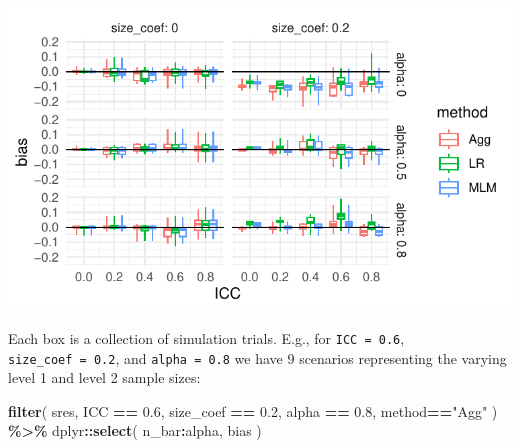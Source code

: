 \documentclass[
]{book}
\newenvironment{Shaded}{\begin{snugshade}}{\end{snugshade}}
\newcommand{\AttributeTok}[1]{\textcolor[rgb]{0.13,0.29,0.53}{#1}}
\newcommand{\ConstantTok}[1]{\textcolor[rgb]{0.56,0.35,0.01}{#1}}
\newcommand{\DecValTok}[1]{\textcolor[rgb]{0.00,0.00,0.81}{#1}}
\newcommand{\FloatTok}[1]{\textcolor[rgb]{0.00,0.00,0.81}{#1}}
\newcommand{\FunctionTok}[1]{\textcolor[rgb]{0.13,0.29,0.53}{\textbf{#1}}}
\newcommand{\NormalTok}[1]{#1}
\newcommand{\OtherTok}[1]{\textcolor[rgb]{0.56,0.35,0.01}{#1}}
\newcommand{\SpecialCharTok}[1]{\textcolor[rgb]{0.81,0.36,0.00}{\textbf{#1}}}
\newcommand{\StringTok}[1]{\textcolor[rgb]{0.31,0.60,0.02}{#1}}
\begin{document}
\begin{Shaded}
\end{Shaded}

\begin{center}\includegraphics[width=0.75\linewidth]{Designing-Simulations-in-R_files/figure-latex/clusterRCT_plot_bias_v1-1} \end{center}

Each box is a collection of simulation trials. E.g., for \texttt{ICC\ =\ 0.6}, \texttt{size\_coef\ =\ 0.2}, and \texttt{alpha\ =\ 0.8} we have 9 scenarios representing the varying level 1 and level 2 sample sizes:

\begin{Shaded}
\begin{Highlighting}[]
\FunctionTok{filter}\NormalTok{( sres, ICC }\SpecialCharTok{==} \FloatTok{0.6}\NormalTok{, size\_coef }\SpecialCharTok{==} \FloatTok{0.2}\NormalTok{,}
\NormalTok{        alpha }\SpecialCharTok{==} \FloatTok{0.8}\NormalTok{, method}\SpecialCharTok{==}\StringTok{"Agg"}\NormalTok{ ) }\SpecialCharTok{\%\textgreater{}\%}
\NormalTok{  dplyr}\SpecialCharTok{::}\FunctionTok{select}\NormalTok{( n\_bar}\SpecialCharTok{:}\NormalTok{alpha, bias )}
\end{Highlighting}
\end{Shaded}
\end{document}
